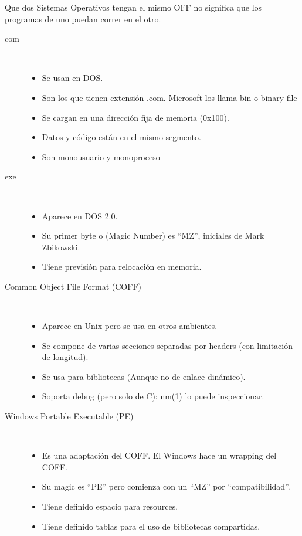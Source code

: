 \documentclass[a4paper, twoside]{article}
\begin{document}
Que dos Sistemas Operativos tengan el mismo OFF no significa que los programas
de uno puedan correr en el otro.

\begin{description}
  \item[com] ~
  \begin{itemize}
    \item Se usan en DOS.
    \item Son los que tienen extensión .com.
    Microsoft los llama bin o binary file
    \item Se cargan en una dirección fija de memoria (0x100).
    \item Datos y código están en el mismo segmento.
    \item Son monousuario y monoproceso
  \end{itemize}

  \item[exe] ~
  \begin{itemize}
    \item Aparece en DOS 2.0.
    \item Su primer byte o (Magic Number) es “MZ”, iniciales de Mark Zbikowski.
    \item Tiene previsión para relocación en memoria.
  \end{itemize}

  \item[Common Object File Format (COFF)] ~
  \begin{itemize}
    \item Aparece en Unix pero se usa en otros ambientes.
    \item Se compone de varias secciones separadas por headers (con limitación
    de longitud).
    \item Se usa para bibliotecas (Aunque no de enlace dinámico).
    \item Soporta debug (pero solo de C): nm(1) lo puede inspeccionar.
  \end{itemize}

  \item[Windows Portable Executable (PE)] ~
  \begin{itemize}
    \item Es una adaptación del COFF. El Windows hace un wrapping del COFF.
    \item Su magic es “PE” pero comienza con un “MZ” por “compatibilidad”.
    \item Tiene definido espacio para resources.
    \item Tiene definido tablas para el uso de bibliotecas compartidas.
  \end{itemize}


\end{description}
\end{document}
